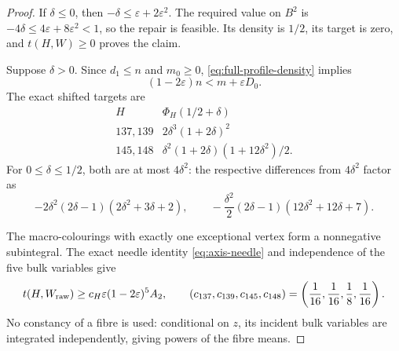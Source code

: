 \documentclass[11pt]{article}
\begin{document}
\begin{proof}
If $\delta\leq0$, then
$-\delta\leq\varepsilon+2\varepsilon^2$.  The required value on $B^2$ is
$-4\delta\leq4\varepsilon+8\varepsilon^2<1$, so the repair is feasible.
Its density is $1/2$, its target is zero, and $t(H,W)\geq0$ proves the claim.

Suppose $\delta>0$.  Since $d_1\leq n$ and $m_0\geq0$,
\eqref{eq:full-profile-density} implies
\begin{equation}
 (1-2\varepsilon)n<m+\varepsilon D_0.
 \label{eq:full-profile-deficit}
\end{equation}
The exact shifted targets are
\[
\begin{array}{c|c}
H&\Phi_H(1/2+\delta)\\ \hline
137,139&2\delta^3(1+2\delta)^2\\
145,148&\delta^2(1+2\delta)(1+12\delta^2)/2.
\end{array}
\]
For $0\leq\delta\leq1/2$, both are at most $4\delta^2$: the respective
differences from $4\delta^2$ factor as
\begin{equation}
 -2\delta^2(2\delta-1)(2\delta^2+3\delta+2),
 \qquad
 -\frac{\delta^2}{2}(2\delta-1)(12\delta^2+12\delta+7).
 \label{eq:full-profile-target-bound}
\end{equation}

The macro-colourings with exactly one exceptional vertex form a
nonnegative subintegral.  The exact needle identity
\eqref{eq:axis-needle} and independence of the five bulk variables give
\begin{equation}
 t(H,W_{\rm raw})
 \geq c_H\varepsilon(1-2\varepsilon)^5A_2,
 \qquad
 (c_{137},c_{139},c_{145},c_{148})
 =\left(\frac1{16},\frac1{16},\frac18,\frac1{16}\right).
 \label{eq:full-profile-one-vertex}
\end{equation}
No constancy of a fibre is used: conditional on $z$, its incident bulk
variables are integrated independently, giving powers of the fibre means.


\end{proof}
\end{document}
